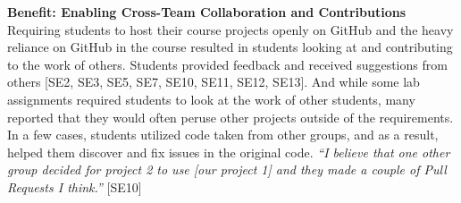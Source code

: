 


\textbf{Benefit: Enabling Cross-Team Collaboration and Contributions}\\
Requiring students to host their course projects openly on GitHub and the heavy reliance on GitHub in the course resulted in students looking at and contributing to the work of others. Students provided feedback and received suggestions from others [SE2, SE3, SE5, SE7, SE10, SE11, SE12, SE13]. And while some lab assignments required students to look at the work of other students, many reported that they would often peruse other projects outside of the requirements. In a few cases, students utilized code taken from other groups, and as a result, helped them discover and fix issues in the original code. \textit{``I believe that one other group decided for project 2 to use [our project 1] and they made a couple of Pull Requests I think.''} [SE10]

